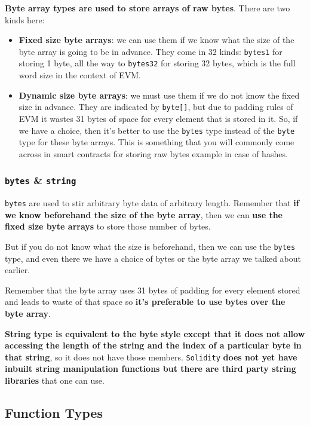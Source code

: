 \textbf{Byte array types are used to store arrays of raw bytes}. There
are two kinds here:

\begin{itemize}
\tightlist
\item
  \textbf{Fixed size byte arrays}: we can use them if we know what the
  size of the byte array is going to be in advance. They come in 32
  kinds: \texttt{bytes1} for storing 1 byte, all the way to
  \texttt{bytes32} for storing 32 bytes, which is the full word size in
  the context of EVM.
\item
  \textbf{Dynamic size byte arrays}: we must use them if we do not know
  the fixed size in advance. They are indicated by \texttt{byte{[}{]}},
  but due to padding rules of EVM it wastes 31 bytes of space for every
  element that is stored in it. So, if we have a choice, then it's
  better to use the \texttt{bytes} type instead of the \texttt{byte}
  type for these byte arrays. This is something that you will commonly
  come across in smart contracts for storing raw bytes example in case
  of hashes.
\end{itemize}

\subsubsection{\texorpdfstring{\texttt{bytes} \&
\texttt{string}}{bytes \& string}}\label{bytes-string}

\texttt{bytes} are used to stir arbitrary byte data of arbitrary length.
Remember that \textbf{if we know beforehand the size of the byte array},
then we can \textbf{use the fixed size byte arrays} to store those
number of bytes.

But if you do not know what the size is beforehand, then we can use the
\texttt{bytes} type, and even there we have a choice of bytes or the
byte array we talked about earlier.

Remember that the byte array uses 31 bytes of padding for every element
stored and leads to waste of that space so \textbf{it's preferable to
use bytes over the byte array}.

\textbf{String type is equivalent to the byte style except that it does
not allow accessing the length of the string and the index of a
particular byte in that string}, so it does not have those members.
\texttt{Solidity} \textbf{does not yet have inbuilt string manipulation
functions but there are third party string libraries} that one can use.

\subsection{Function Types}\label{function-types}

